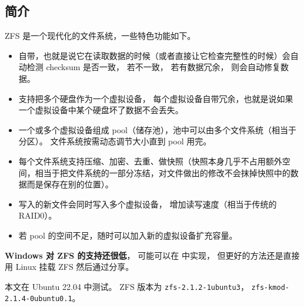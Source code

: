 

\subsection{简介}
ZFS 是一个现代化的文件系统，一些特色功能如下。
\begin{itemize}
\item 自带，也就是说它在读取数据的时候（或者直接让它检查完整性的时候）会自动检测 checksum 是否一致， 若不一致， 若有数据冗余， 则会自动修复数据。
\item 支持把多个硬盘作为一个虚拟设备， 每个虚拟设备自带冗余，也就是说如果一个虚拟设备中某个硬盘坏了数据不会丢失。
\item 一个或多个虚拟设备组成 pool（储存池），池中可以由多个文件系统（相当于分区）。 文件系统按需动态调节大小直到 pool 用完。
\item 每个文件系统支持压缩、加密、去重、做快照（快照本身几乎不占用额外空间，相当于把文件系统的一部分冻结，对文件做出的修改不会抹掉快照中的数据而是保存在别的位置）。
\item 写入的新文件会同时写入多个虚拟设备， 增加读写速度（相当于传统的 RAID0）。
\item 若 pool 的空间不足，随时可以加入新的虚拟设备扩充容量。
\end{itemize}

\textbf{Windows 对 ZFS 的支持还很低}， 可能可以在  中实现， 但更好的方法还是直接用 Linux 挂载 ZFS 然后通过分享。

本文在 Ubuntu 22.04 中测试。 ZFS 版本为 \verb`zfs-2.1.2-1ubuntu3`， \verb`zfs-kmod-2.1.4-0ubuntu0.1`。

